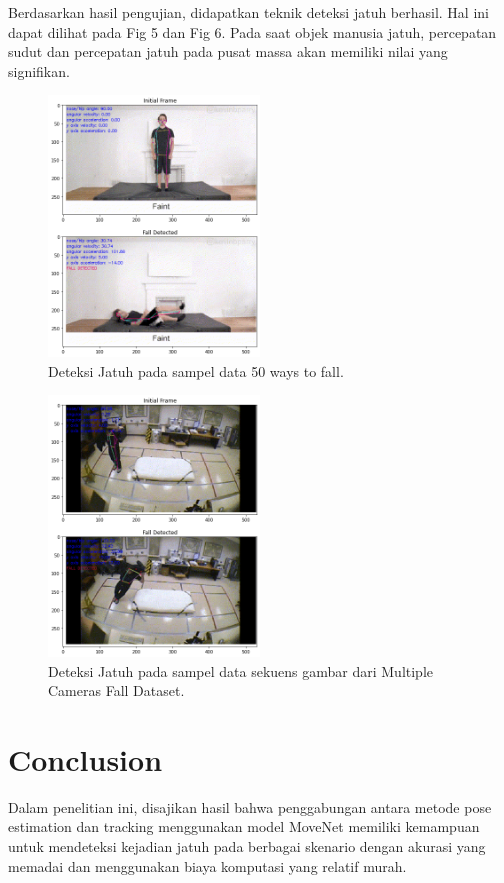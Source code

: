 \documentclass[conference]{IEEEtran}
\begin{document}
Berdasarkan hasil pengujian, didapatkan teknik deteksi jatuh berhasil. Hal ini dapat dilihat pada Fig 5 dan Fig 6. Pada saat objek manusia jatuh, percepatan sudut dan percepatan jatuh pada pusat massa akan memiliki nilai yang signifikan.

\begin{figure}
    \centerline{\includegraphics[width=0.5\textwidth]{figures/fall_detect1.png}}
    \caption{Deteksi Jatuh pada sampel data 50 ways to fall.}
\end{figure}

\begin{figure}
    \centerline{\includegraphics[width=0.5\textwidth]{figures/fall_detect2.png}}
    \caption{Deteksi Jatuh pada sampel data sekuens gambar dari Multiple Cameras Fall Dataset.}
\end{figure}

\section{Conclusion}
Dalam penelitian ini, disajikan hasil bahwa penggabungan antara metode pose estimation dan tracking menggunakan model MoveNet memiliki kemampuan untuk mendeteksi kejadian jatuh pada berbagai skenario dengan akurasi yang memadai dan menggunakan biaya komputasi yang relatif murah.
\end{document}
